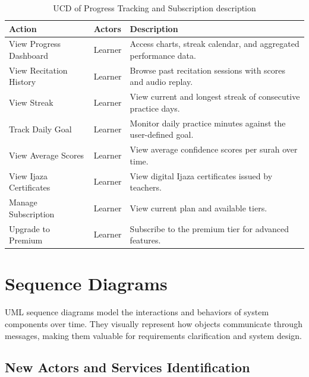 \begin{table}[H]
  \centering
  \caption{UCD of Progress Tracking and Subscription description}
  \label{tab:cs_ucd_progress}
  \renewcommand{\arraystretch}{1.3}
  \begin{tabular}{lp{3cm}p{7cm}}
    \toprule
    \textbf{Action} & \textbf{Actors} & \textbf{Description} \\
    \midrule
    View Progress Dashboard & Learner & Access charts, streak calendar, and aggregated performance data. \\
    View Recitation History & Learner & Browse past recitation sessions with scores and audio replay. \\
    View Streak & Learner & View current and longest streak of consecutive practice days. \\
    Track Daily Goal & Learner & Monitor daily practice minutes against the user-defined goal. \\
    View Average Scores & Learner & View average confidence scores per surah over time. \\
    View Ijaza Certificates & Learner & View digital Ijaza certificates issued by teachers. \\
    Manage Subscription & Learner & View current plan and available tiers. \\
    Upgrade to Premium & Learner & Subscribe to the premium tier for advanced features. \\
    \bottomrule
  \end{tabular}
\end{table}

\section{Sequence Diagrams}
\label{sec:cs_sequence}

\begin{emeraldbox}[title=Sequence Diagram]
UML sequence diagrams model the interactions and behaviors of system components over time. They visually represent how objects communicate through messages, making them valuable for requirements clarification and system design.
\end{emeraldbox}

\subsection{New Actors and Services Identification}

